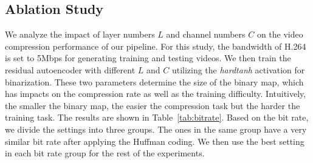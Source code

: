 \documentclass[letterpaper]{article} %
\begin{document}
	\subsection{Ablation Study}

	{} We analyze the impact of layer numbers $L$ and channel numbers $C$ on the video compression performance of our pipeline. For this study, the bandwidth of H.264 is set to 5Mbps for generating training and testing videos. We then train the residual autoencoder with different $L$ and $C$ utilizing the \textit{hardtanh} activation for binarization. These two parameters determine the size of the binary map, which has impacts on the compression rate as well as the training difficulty. Intuitively, the smaller the binary map, the easier the compression task but the harder the training task. The results are shown in Table~\ref{tab:bitrate}. Based on the bit rate, we divide the settings into three groups. The ones in the same group have a very similar bit rate after applying the Huffman coding. We then use the best setting in each bit rate group for the rest of the experiments.
\end{document}

